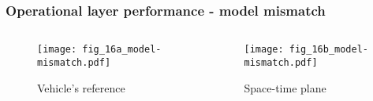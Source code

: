 \begin{frame}
    \frametitle{Operational layer performance - model mismatch}
    \begin{columns}
      \begin{column}{0.5\textwidth}
        \begin{figure}
          \centering
          \texttt{[image: fig\_16a\_model-mismatch.pdf]}
          \caption{Vehicle's reference}
        \end{figure}
      \end{column}
      \begin{column}{0.5\textwidth}
        \begin{figure}
          \centering
          \texttt{[image: fig\_16b\_model-mismatch.pdf]}
          \caption{Space-time plane}
        \end{figure}
      \end{column}
    \end{columns}
\end{frame}